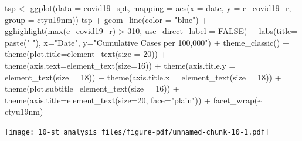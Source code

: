 \documentclass[
  letterpaper,
  DIV=11,
  numbers=noendperiod,
  oneside]{scrreprt}
\newenvironment{Shaded}{\begin{snugshade}}{\end{snugshade}}
\newcommand{\AttributeTok}[1]{\textcolor[rgb]{0.40,0.45,0.13}{#1}}
\newcommand{\ConstantTok}[1]{\textcolor[rgb]{0.56,0.35,0.01}{#1}}
\newcommand{\DecValTok}[1]{\textcolor[rgb]{0.68,0.00,0.00}{#1}}
\newcommand{\FunctionTok}[1]{\textcolor[rgb]{0.28,0.35,0.67}{#1}}
\newcommand{\NormalTok}[1]{\textcolor[rgb]{0.00,0.23,0.31}{#1}}
\newcommand{\OtherTok}[1]{\textcolor[rgb]{0.00,0.23,0.31}{#1}}
\newcommand{\SpecialCharTok}[1]{\textcolor[rgb]{0.37,0.37,0.37}{#1}}
\newcommand{\StringTok}[1]{\textcolor[rgb]{0.13,0.47,0.30}{#1}}
\begin{document}
\begin{Shaded}
\begin{Highlighting}[]
\NormalTok{tsp }\OtherTok{\textless{}{-}} \FunctionTok{ggplot}\NormalTok{(}\AttributeTok{data =}\NormalTok{ covid19\_spt,}
            \AttributeTok{mapping =} \FunctionTok{aes}\NormalTok{(}\AttributeTok{x =}\NormalTok{ date, }\AttributeTok{y =}\NormalTok{ c\_covid19\_r,}
                          \AttributeTok{group =}\NormalTok{ ctyu19nm))}
\NormalTok{tsp }\SpecialCharTok{+} \FunctionTok{geom\_line}\NormalTok{(}\AttributeTok{color =} \StringTok{"blue"}\NormalTok{) }\SpecialCharTok{+} 
    \FunctionTok{gghighlight}\NormalTok{(}\FunctionTok{max}\NormalTok{(c\_covid19\_r) }\SpecialCharTok{\textgreater{}} \DecValTok{310}\NormalTok{, }\AttributeTok{use\_direct\_label =} \ConstantTok{FALSE}\NormalTok{) }\SpecialCharTok{+}
    \FunctionTok{labs}\NormalTok{(}\AttributeTok{title=} \FunctionTok{paste}\NormalTok{(}\StringTok{" "}\NormalTok{), }\AttributeTok{x=}\StringTok{"Date"}\NormalTok{, }\AttributeTok{y=}\StringTok{"Cumulative Cases per 100,000"}\NormalTok{) }\SpecialCharTok{+}
    \FunctionTok{theme\_classic}\NormalTok{() }\SpecialCharTok{+}
    \FunctionTok{theme}\NormalTok{(}\AttributeTok{plot.title=}\FunctionTok{element\_text}\NormalTok{(}\AttributeTok{size =} \DecValTok{20}\NormalTok{)) }\SpecialCharTok{+}
    \FunctionTok{theme}\NormalTok{(}\AttributeTok{axis.text=}\FunctionTok{element\_text}\NormalTok{(}\AttributeTok{size=}\DecValTok{16}\NormalTok{)) }\SpecialCharTok{+}
    \FunctionTok{theme}\NormalTok{(}\AttributeTok{axis.title.y =} \FunctionTok{element\_text}\NormalTok{(}\AttributeTok{size =} \DecValTok{18}\NormalTok{)) }\SpecialCharTok{+}
    \FunctionTok{theme}\NormalTok{(}\AttributeTok{axis.title.x =} \FunctionTok{element\_text}\NormalTok{(}\AttributeTok{size =} \DecValTok{18}\NormalTok{)) }\SpecialCharTok{+}
    \FunctionTok{theme}\NormalTok{(}\AttributeTok{plot.subtitle=}\FunctionTok{element\_text}\NormalTok{(}\AttributeTok{size =} \DecValTok{16}\NormalTok{)) }\SpecialCharTok{+}
    \FunctionTok{theme}\NormalTok{(}\AttributeTok{axis.title=}\FunctionTok{element\_text}\NormalTok{(}\AttributeTok{size=}\DecValTok{20}\NormalTok{, }\AttributeTok{face=}\StringTok{"plain"}\NormalTok{)) }\SpecialCharTok{+}
    \FunctionTok{facet\_wrap}\NormalTok{(}\SpecialCharTok{\textasciitilde{}}\NormalTok{ ctyu19nm)}
\end{Highlighting}
\end{Shaded}

\texttt{[image: 10-st\_analysis\_files/figure-pdf/unnamed-chunk-10-1.pdf]}
\end{document}
